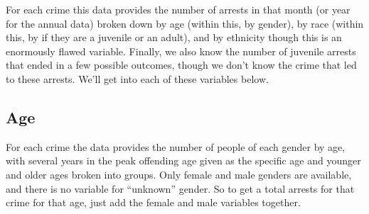 \documentclass[
  12pt,
  openany]{book}
\begin{document}
For each crime this data provides the number of arrests in that month (or year for the annual data) broken down by age (within this, by gender), by race (within this, by if they are a juvenile or an adult), and by ethnicity though this is an enormously flawed variable. Finally, we also know the number of juvenile arrests that ended in a few possible outcomes, though we don't know the crime that led to these arrests. We'll get into each of these variables below.

\hypertarget{age}{%
\subsection{Age}\label{age}}

For each crime the data provides the number of people of each gender by age, with several years in the peak offending age given as the specific age and younger and older ages broken into groups. Only female and male genders are available, and there is no variable for ``unknown'' gender. So to get a total arrests for that crime for that age, just add the female and male variables together.
\end{document}
